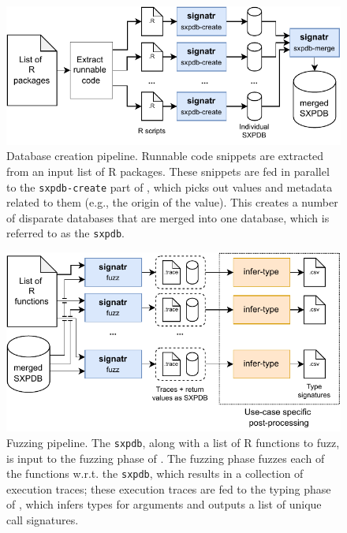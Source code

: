 \documentclass[sigplan,anonymous,review]{acmart}
\begin{document}
\begin{figure}
    \centering
    \includegraphics[width=\columnwidth]{code-and-figures/sxdb-pipeline.pdf}
    \caption{
    Database creation pipeline.
    Runnable code snippets are extracted from an input list of R packages.
    These snippets are fed in parallel to the {\tt sxpdb-create} part of \tool, which picks out values and metadata related to them (e.g., the origin of the value). 
    This creates a number of disparate databases that are merged into one database, which is referred to as the {\tt sxpdb}.
    }\label{fig:sxpdb-pipeline}
\end{figure}

\begin{figure}
    \centering
    \includegraphics[width=\columnwidth]{code-and-figures/fuzz-pipeline.pdf}
    \caption{
    Fuzzing pipeline.
    The {\tt sxpdb}, along with a list of R functions to fuzz, is input to the fuzzing phase of \tool.
    The fuzzing phase fuzzes each of the functions w.r.t. the {\tt sxpdb}, which results in a collection of execution traces; these execution traces are fed to the typing phase of \tool, which infers types for arguments and outputs a list of unique call signatures.
    }\label{fig:fuzz-pipeline}
\end{figure}
\end{document}
